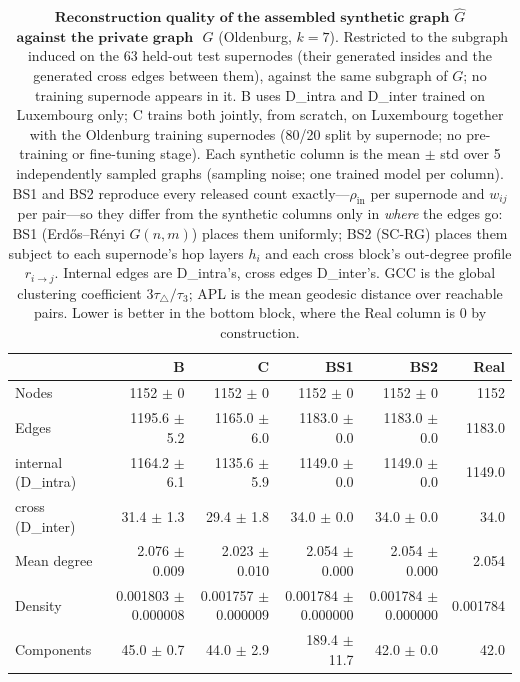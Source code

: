 \begin{table}[H]
\centering
\caption{$\textbf{Reconstruction quality of the assembled synthetic graph}$
$\widehat{G}$ $\textbf{ against the private graph }$ $G$ (Oldenburg, $k{=}7$). Restricted to the subgraph induced on the 63 held-out test supernodes (their generated insides and the generated cross edges between them), against the same subgraph of $G$; no training supernode appears in it.
B uses D\_intra and D\_inter trained on Luxembourg only; C trains both jointly, from
scratch, on Luxembourg together with the Oldenburg training supernodes (80/20 split
by supernode; no pre-training or fine-tuning stage). Each synthetic column is the
mean $\pm$ std over 5 independently sampled graphs (sampling noise; one trained
model per column). BS1 and BS2 reproduce every released count exactly---$\rho_{\mathrm{in}}$
per supernode and $w_{ij}$ per pair---so they differ from the synthetic columns
only in \emph{where} the edges go: BS1 (Erd\H{o}s--R\'enyi $G(n,m)$) places them
uniformly; BS2 (SC-RG) places them subject to each supernode's hop layers $h_i$ and
each cross block's out-degree profile $r_{i\to j}$. Internal edges are D\_intra's, cross edges
D\_inter's. GCC is the global clustering coefficient $3\tau_{\triangle}/\tau_{3}$;
APL is the mean geodesic distance over reachable pairs. Lower is better in the
bottom block, where the Real column is $0$ by construction.}
\label{tab:lsyn-oldenburg-k7-test}
\begin{tabular}{lrrrrr}
\toprule
 & B & C & BS1 & BS2 & Real \\
\midrule
Nodes                         & 1152 $\pm$ 0 & 1152 $\pm$ 0 & 1152 $\pm$ 0 & 1152 $\pm$ 0 & 1152 \\
Edges                         & 1195.6 $\pm$ 5.2 & 1165.0 $\pm$ 6.0 & 1183.0 $\pm$ 0.0 & 1183.0 $\pm$ 0.0 & 1183.0 \\
\quad internal (D\_intra)     & 1164.2 $\pm$ 6.1 & 1135.6 $\pm$ 5.9 & 1149.0 $\pm$ 0.0 & 1149.0 $\pm$ 0.0 & 1149.0 \\
\quad cross (D\_inter)        & 31.4 $\pm$ 1.3 & 29.4 $\pm$ 1.8 & 34.0 $\pm$ 0.0 & 34.0 $\pm$ 0.0 & 34.0 \\
Mean degree                   & 2.076 $\pm$ 0.009 & 2.023 $\pm$ 0.010 & 2.054 $\pm$ 0.000 & 2.054 $\pm$ 0.000 & 2.054 \\
Density                       & 0.001803 $\pm$ 0.000008 & 0.001757 $\pm$ 0.000009 & 0.001784 $\pm$ 0.000000 & 0.001784 $\pm$ 0.000000 & 0.001784 \\
Components                    & 45.0 $\pm$ 0.7 & 44.0 $\pm$ 2.9 & 189.4 $\pm$ 11.7 & 42.0 $\pm$ 0.0 & 42.0 \\

\end{tabular}
\end{table}
